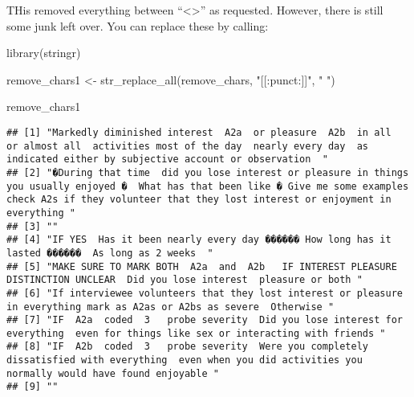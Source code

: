 \documentclass[
]{article}
\newenvironment{Shaded}{\begin{snugshade}}{\end{snugshade}}
\newcommand{\FunctionTok}[1]{\textcolor[rgb]{0.00,0.00,0.00}{#1}}
\newcommand{\NormalTok}[1]{#1}
\newcommand{\OtherTok}[1]{\textcolor[rgb]{0.56,0.35,0.01}{#1}}
\newcommand{\StringTok}[1]{\textcolor[rgb]{0.31,0.60,0.02}{#1}}
\begin{document}
THis removed everything between ``\textless\textgreater{}'' as
requested. However, there is still some junk left over. You can replace
these by calling:

\begin{Shaded}
\begin{Highlighting}[]
\FunctionTok{library}\NormalTok{(stringr)}

\NormalTok{remove\_chars1 }\OtherTok{\textless{}{-}} \FunctionTok{str\_replace\_all}\NormalTok{(remove\_chars, }\StringTok{"[[:punct:]]"}\NormalTok{, }\StringTok{" "}\NormalTok{)}

\NormalTok{remove\_chars1}
\end{Highlighting}
\end{Shaded}

\begin{verbatim}
## [1] "Markedly diminished interest  A2a  or pleasure  A2b  in all  or almost all  activities most of the day  nearly every day  as indicated either by subjective account or observation  "                                    
## [2] "�During that time  did you lose interest or pleasure in things you usually enjoyed �  What has that been like � Give me some examples    check A2s if they volunteer that they lost interest or enjoyment in everything "
## [3] ""                                                                                                                                                                                                                        
## [4] "IF YES  Has it been nearly every day ������ How long has it lasted ������  As long as 2 weeks  "                                                                                                                         
## [5] "MAKE SURE TO MARK BOTH  A2a  and  A2b   IF INTEREST PLEASURE DISTINCTION UNCLEAR  Did you lose interest  pleasure or both "                                                                                              
## [6] "If interviewee volunteers that they lost interest or pleasure in everything mark as A2as or A2bs as severe  Otherwise "                                                                                                  
## [7] "IF  A2a  coded  3   probe severity  Did you lose interest for everything  even for things like sex or interacting with friends "                                                                                         
## [8] "IF  A2b  coded  3   probe severity  Were you completely dissatisfied with everything  even when you did activities you normally would have found enjoyable "                                                             
## [9] ""
\end{verbatim}
\end{document}
